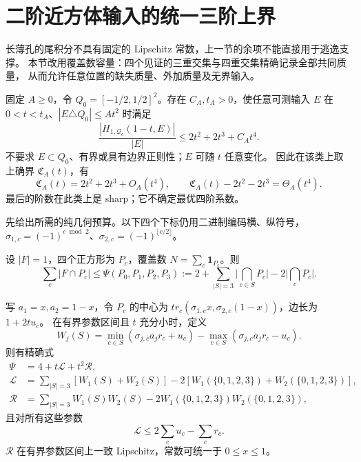 \section{二阶近方体输入的统一三阶上界}\label{ns:section}

长薄孔的尾积分不具有固定的 Lipschitz 常数，上一节的余项不能直接用于逃逸支撑。
本节改用覆盖数容量：四个见证的三重交集与四重交集精确记录全部共同质量，
从而允许任意位置的缺失质量、外加质量及无界输入。

\begin{theorem}[二阶近正方形类]\label{ns:main}
固定 $A\ge0$，令 $Q_0=[-1/2,1/2]^2$。存在 $C_A,t_A>0$，使任意可测输入
$E$ 在 $0<t<t_A$、$|E\triangle Q_0|\le At^2$ 时满足
\begin{equation}\label{ns:upper}
 \frac{|H_{1,\mathcal Q_c}(1-t,E)|}{|E|}
 \le2t^2+2t^3+C_At^4.
\end{equation}
不要求 $E\subset Q_0$、有界或具有边界正则性；$E$ 可随 $t$ 任意变化。
因此在该类上取上确界 $\mathfrak C_A(t)$，有
\[
 \mathfrak C_A(t)=2t^2+2t^3+O_A(t^4),\qquad
 \mathfrak C_A(t)-2t^2-2t^3=\Theta_A(t^4).
\]
最后的阶数在此类上是 sharp；它不确定最优四阶系数。
\end{theorem}

先给出所需的纯几何预算。以下四个下标仍用二进制编码横、纵符号，
$\sigma_{1,c}=(-1)^{c\bmod2}$、$\sigma_{2,c}=(-1)^{\lfloor c/2\rfloor}$。

\begin{lemma}[四见证的精确覆盖容量]\label{ns:capacity}
设 $|F|=1$，四个正方形为 $P_c$，覆盖数 $N=\sum_c\mathbf1_{P_c}$。则
\begin{equation}\label{ns:capacity-exact}
 \sum_c|F\cap P_c|\le\Psi(P_0,P_1,P_2,P_3)
 :=2+\sum_{|S|=3}\Big|\bigcap_{c\in S}P_c\Big|
       -2\Big|\bigcap_cP_c\Big|.
\end{equation}

写 $a_1=x,a_2=1-x$，令 $P_c$ 的中心为
$t r_c(\sigma_{1,c}x,\sigma_{2,c}(1-x))$，边长为 $1+2tu_c$。
在有界参数区间且 $t$ 充分小时，定义
\[
 W_j(S)=\min_{c\in S}(\sigma_{j,c}a_jr_c+u_c)
       -\max_{c\in S}(\sigma_{j,c}a_jr_c-u_c).
\]
则有精确式
\begin{align}
 \Psi&=4+t\mathcal L+t^2\mathcal R,\label{ns:psi}\\
 \mathcal L&=\sum_{|S|=3}[W_1(S)+W_2(S)]
                -2[W_1(\{0,1,2,3\})+W_2(\{0,1,2,3\})],\nonumber\\
 \mathcal R&=\sum_{|S|=3}W_1(S)W_2(S)
                -2W_1(\{0,1,2,3\})W_2(\{0,1,2,3\}),\nonumber
\end{align}
且对所有这些参数
\begin{equation}\label{ns:first-budget}
 \mathcal L\le2\sum_cu_c-\sum_cr_c.
\end{equation}
$\mathcal R$ 在有界参数区间上一致 Lipschitz，常数可统一于 $0\le x\le1$。
\end{lemma}

